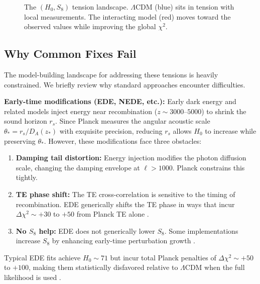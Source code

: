 \documentclass[twocolumn,showpacs,preprintnumbers,amsmath,amssymb,prd]{revtex4-2}
\begin{document}
\begin{figure}[h]
\centering
{}
\caption{The $(H_0, S_8)$ tension landscape. $\Lambda$CDM (blue) sits in tension with local measurements. The interacting model (red) moves toward the observed values while improving the global $\chi^2$.}
\label{fig:tensions}
\end{figure}

\subsection{Why Common Fixes Fail}

The model-building landscape for addressing these tensions is heavily constrained. We briefly review why standard approaches encounter difficulties.

\textbf{Early-time modifications (EDE, NEDE, etc.):} Early dark energy and related models inject energy near recombination ($z \sim 3000$--$5000$) to shrink the sound horizon $r_s$. Since Planck measures the angular acoustic scale $\theta_* = r_s/D_A(z_*)$ with exquisite precision, reducing $r_s$ allows $H_0$ to increase while preserving $\theta_*$. However, these modifications face three obstacles:
\begin{enumerate}
    \item \textbf{Damping tail distortion:} Energy injection modifies the photon diffusion scale, changing the damping envelope at $\ell > 1000$. Planck constrains this tightly.
    \item \textbf{TE phase shift:} The TE cross-correlation is sensitive to the timing of recombination. EDE generically shifts the TE phase in ways that incur $\Delta\chi^2 \sim +30$ to $+50$ from Planck TE alone \cite{Hill2020,Smith2022}.
    \item \textbf{No $S_8$ help:} EDE does not generically lower $S_8$. Some implementations increase $S_8$ by enhancing early-time perturbation growth \cite{Vagnozzi2021}.
\end{enumerate}
Typical EDE fits achieve $H_0 \sim 71$ but incur total Planck penalties of $\Delta\chi^2 \sim +50$ to $+100$, making them statistically disfavored relative to $\Lambda$CDM when the full likelihood is used \cite{Hill2020}.
\end{document}
